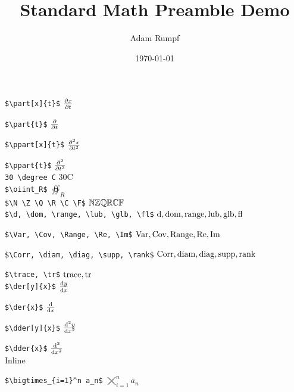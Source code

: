 \documentclass[10pt,jtb]{article}
\author{Adam Rumpf}
\date{\today}
\title{Standard Math Preamble Demo}
\begin{document}
\maketitle

\verb|$\part[x]{t}$| \hfill $\part[x]{t}$

\verb|$\part{t}$| \hfill $\part{t}$

\verb|$\ppart[x]{t}$| \hfill $\ppart[x]{t}$

\verb|$\ppart{t}$| \hfill $\ppart{t}$ \\

\verb|30 \degree C| \hfill 30\degree C \\

\verb|$\oiint_R$| \hfill $\oiint_R$ \\

\verb|$\N \Z \Q \R \C \F$| \hfill $\N \Z \Q \R \C \F$ \\

\verb|$\d, \dom, \range, \lub, \glb, \fl$| \hfill $\d, \dom, \range, \lub, \glb, \fl$

\verb|$\Var, \Cov, \Range, \Re, \Im$| \hfill $\Var, \Cov, \Range, \Re, \Im$

\verb|$\Corr, \diam, \diag, \supp, \rank$| \hfill $\Corr, \diam, \diag, \supp, \rank$

\verb|$\trace, \tr$| \hfill $\trace, \tr$ \\

\verb|$\der[y]{x}$| \hfill $\der[y]{x}$

\verb|$\der{x}$| \hfill $\der{x}$

\verb|$\dder[y]{x}$| \hfill $\dder[y]{x}$

\verb|$\dder{x}$| \hfill $\dder{x}$ \\

Inline

\verb|$\bigtimes_{i=1}^n a_n$| \hfill $\bigtimes_{i=1}^n a_n$ \\
\end{document}

